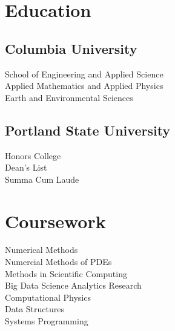\documentclass[]{deedy-resume-openfont}
\begin{document}
%
%
\lastupdated

%
%



%
%

\begin{minipage}[t]{0.33\textwidth} 


\section{Education} 
    \subsection{Columbia University}
        School of Engineering and Applied Science\\
        Applied Mathematics and Applied Physics\\
        Earth and Environmental Sciences\\
    \sectionsep
    \subsection{Portland State University}
        Honors College \\
        Dean's List \\
        Summa Cum Laude
    \sectionsep
\sectionsep


\section{Coursework}
Numerical Methods \\
Numercial Methods of PDEs \\
Methods in Scientific Computing \\
Big Data Science Analytics Research \\
Computational Physics \\
Data Structures \\
Systems Programming \\
\sectionsep


\end{minipage}
\end{document}

